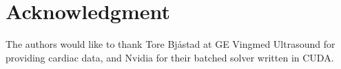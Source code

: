 \documentclass[conference]{IEEEtran}
\begin{document}









\section*{Acknowledgment}
The authors would like to thank Tore Bj\aa{}stad at GE Vingmed Ultrasound for providing cardiac data, and Nvidia for their batched solver written in CUDA. 









%






\end{document}
